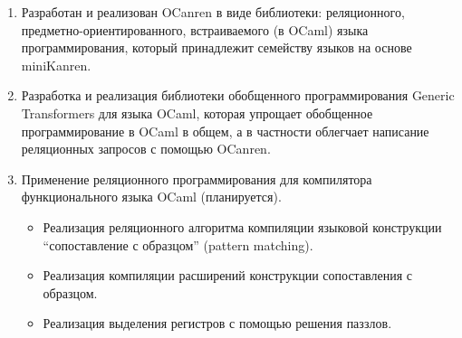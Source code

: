 {{}
\begin{enumerate}
  \item Разработан и реализован OCanren в виде библиотеки: реляционного, предметно-ориентированного, встраиваемого (в OCaml) языка программирования, который принадлежит семейству языков на основе miniKanren.
  \item Разработка и реализация библиотеки обобщенного программирования Generic Transformers для языка OCaml, которая упрощает обобщенное программирование в OCaml в общем, а в частности облегчает написание реляционных запросов с помощью OCanren.
  \item Применение реляционного программирования для компилятора функционального языка OCaml (планируется). 
  \begin{itemize}
  \item   Реализация реляционного алгоритма компиляции языковой конструкции “сопоставление с образцом” (pattern matching).
  \item   Реализация компиляции расширений конструкции сопоставления с образцом.
  \item   Реализация выделения регистров с помощью решения паззлов.
  \end{itemize}



  
  
\end{enumerate}
}

